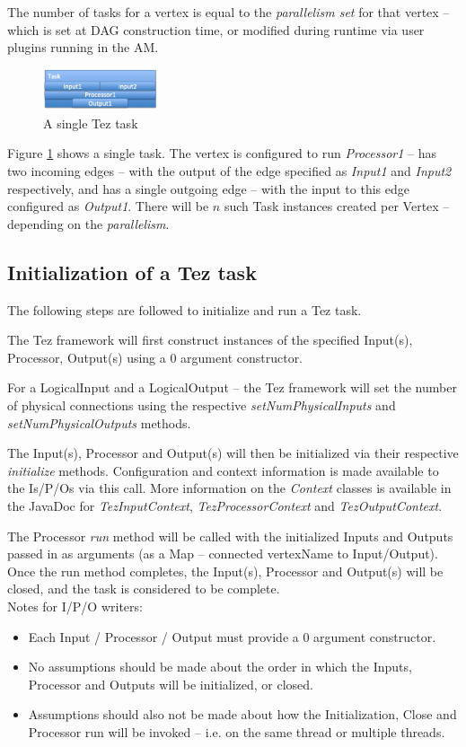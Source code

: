 \documentclass[twocolumn]{article}
\newcommand{\bi}{\begin{itemize}}
\newcommand{\ei}{\end{itemize}}
\newcommand{\ii}{\item}
\begin{document}
The number of tasks for a vertex is equal to the \textit{parallelism set} for
that vertex -- which is set at DAG construction time, or modified during
runtime via user plugins running in the AM.

\begin{figure}[htb]
        \centering
        \includegraphics[width=0.3\textwidth]{tez01}
        \caption{A single Tez task}
        \label{fig13}
\end{figure}

Figure \ref{fig13} shows a single task. The vertex is configured to run
\textit{Processor1} -- has two incoming edges -- with the output of the edge
specified as \textit{Input1} and \textit{Input2} respectively, and has a single outgoing
edge -- with the input to this edge configured as \textit{Output1}. There will be
$n$ such Task instances created per Vertex -- depending on the
\textit{parallelism}.

\subsection{Initialization of a Tez task}

The following steps are followed to initialize and run a Tez task.

The Tez framework will first construct instances of the specified
Input(s), Processor, Output(s) using a 0 argument constructor.

For a LogicalInput and a LogicalOutput -- the Tez framework will set the
number of physical connections using the respective \textit{setNumPhysicalInputs}
and \textit{setNumPhysicalOutputs} methods.

The Input(s), Processor and Output(s) will then be initialized via their
respective \textit{initialize} methods. Configuration and context information is
made available to the Is/P/Os via this call. More information on the
\textit{Context} classes is available in the JavaDoc for \textit{TezInputContext},
\textit{TezProcessorContext} and \textit{TezOutputContext}.

The Processor \textit{run} method will be called with the initialized Inputs and
Outputs passed in as arguments (as a Map -- connected vertexName to
Input/Output).
Once the run method completes, the Input(s), Processor and Output(s)
will be closed, and the task is considered to be complete.
\\
Notes for I/P/O writers:
\bi
\ii Each Input / Processor / Output must provide a 0 argument constructor.
\ii No assumptions should be made about the order in which the Inputs,
Processor and Outputs will be initialized, or closed. 
\ii Assumptions should also not be made about how the Initialization, Close and Processor run
will be invoked -- i.e. on the same thread or multiple threads.
\ei
\end{document}
